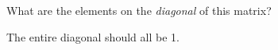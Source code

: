 What are the elements on the \emph{diagonal} of this matrix?

\begin{solution}
The entire diagonal should all be 1.
\end{solution}